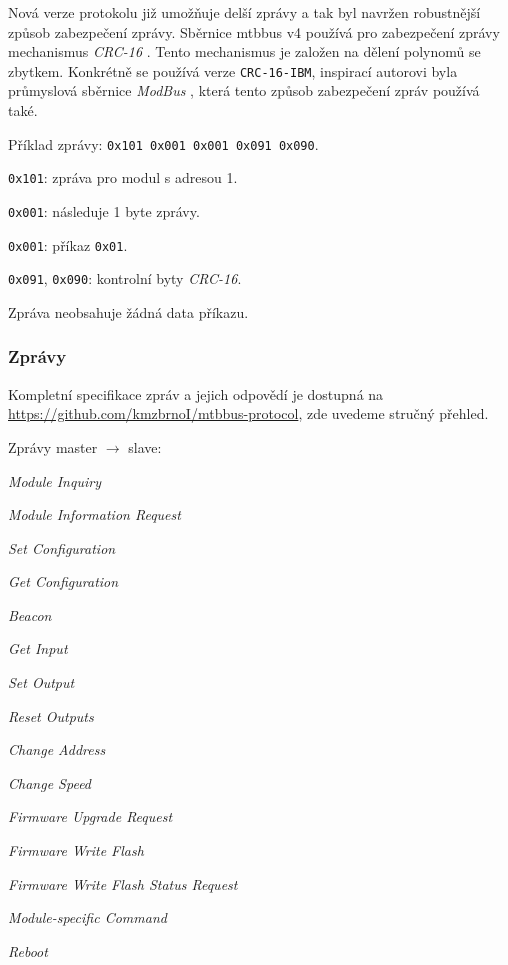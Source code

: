 \begin{enumerate}
Nová verze protokolu již umožňuje delší zprávy a tak byl navržen robustnější
způsob zabezpečení zprávy. Sběrnice \gls{mtbbus} v4 používá pro zabezpečení
zprávy mechanismus \textit{CRC-16} \cite{crc16-modbus}. Tento mechanismus je
založen na dělení polynomů se zbytkem. Konkrétně se používá verze
\texttt{CRC-16-IBM}, inspirací autorovi byla průmyslová sběrnice \textit{ModBus}
\cite{modbus}, která tento způsob zabezpečení zpráv používá také.

\end{enumerate}

Příklad zprávy: \texttt{0x101 0x001 0x001 0x091 0x090}.

\begin{compactenum}
\item \texttt{0x101}: zpráva pro modul s adresou 1.
\item \texttt{0x001}: následuje 1 byte zprávy.
\item \texttt{0x001}: příkaz \texttt{0x01}.
\item \texttt{0x091}, \texttt{0x090}: kontrolní byty \textit{CRC-16}.
\end{compactenum}

Zpráva neobsahuje žádná data příkazu.

\subsubsection{Zprávy}

Kompletní specifikace zpráv a jejich odpovědí je dostupná na
\url{https://github.com/kmzbrnoI/mtbbus-protocol}, zde uvedeme stručný přehled.

Zprávy master $\rightarrow$ slave:

\begin{compactitem}
\item \textit{Module Inquiry}
\item \textit{Module Information Request}
\item \textit{Set Configuration}
\item \textit{Get Configuration}
\item \textit{Beacon}
\item \textit{Get Input}
\item \textit{Set Output}
\item \textit{Reset Outputs}
\item \textit{Change Address}
\item \textit{Change Speed}
\item \textit{Firmware Upgrade Request}
\item \textit{Firmware Write Flash}
\item \textit{Firmware Write Flash Status Request}
\item \textit{Module-specific Command}
\item \textit{Reboot}

\end{compactitem}

